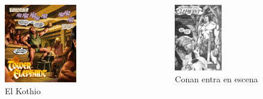 \begin{frame}{}
\begin{columns}
    \begin{figure}[htb]
    \centering
        \includegraphics[width=0.65\textwidth]{img/res/03}
        \caption{El Kothio}
    \end{figure}
    \begin{figure}[htb]
    \centering
        \includegraphics[width=0.55\textwidth]{img/res/04}
        \caption{Conan entra en escena}
    \end{figure}
\end{columns}
\end{frame}

